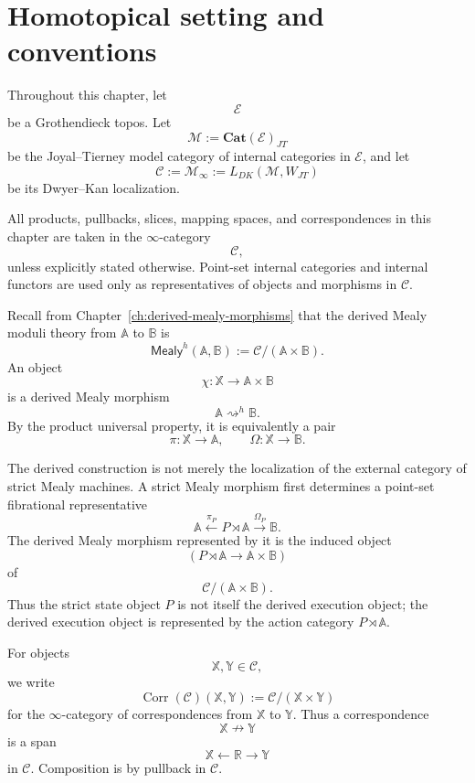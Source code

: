 \section{Homotopical setting and conventions}
\label{sec:derived-relative-homotopical-setting}

Throughout this chapter, let
\[
\mathcal E
\]
be a Grothendieck topos. Let
\[
\mathcal M:=\mathbf{Cat}(\mathcal E)_{JT}
\]
be the Joyal--Tierney model category of internal categories in \(\mathcal E\),
and let
\[
\mathcal C
:=
\mathcal M_\infty
:=
L_{DK}(\mathcal M,W_{JT})
\]
be its Dwyer--Kan localization.

All products, pullbacks, slices, mapping spaces, and correspondences in this
chapter are taken in the \(\infty\)-category
\[
\mathcal C,
\]
unless explicitly stated otherwise. Point-set internal categories and internal
functors are used only as representatives of objects and morphisms in
\(\mathcal C\).

Recall from Chapter~\ref{ch:derived-mealy-morphisms} that the derived Mealy
moduli theory from \(\mathbb A\) to \(\mathbb B\) is
\[
\mathsf{Mealy}^h(\mathbb A,\mathbb B)
:=
\mathcal C/(\mathbb A\times\mathbb B).
\]
An object
\[
\chi:\mathbb X\to\mathbb A\times\mathbb B
\]
is a derived Mealy morphism
\[
\mathbb A\rightsquigarrow^h\mathbb B.
\]
By the product universal property, it is equivalently a pair
\[
\pi:\mathbb X\to\mathbb A,
\qquad
\Omega:\mathbb X\to\mathbb B.
\]

\begin{remark}
\label{rem:derived-relative-not-localization-only}
The derived construction is not merely the localization of the external
category of strict Mealy machines. A strict Mealy morphism first determines a
point-set fibrational representative
\[
\mathbb A
\xleftarrow{\pi_P}
P\rtimes\mathbb A
\xrightarrow{\Omega_P}
\mathbb B.
\]
The derived Mealy morphism represented by it is the induced object
\[
(P\rtimes\mathbb A\to\mathbb A\times\mathbb B)
\]
of
\[
\mathcal C/(\mathbb A\times\mathbb B).
\]
Thus the strict state object \(P\) is not itself the derived execution object;
the derived execution object is represented by the action category
\(P\rtimes\mathbb A\).
\end{remark}

\begin{definition}
\label{def:derived-relative-corr-notation}
For objects
\[
\mathbb X,\mathbb Y\in\mathcal C,
\]
we write
\[
\operatorname{Corr}(\mathcal C)(\mathbb X,\mathbb Y)
:=
\mathcal C/(\mathbb X\times\mathbb Y)
\]
for the \(\infty\)-category of correspondences from \(\mathbb X\) to
\(\mathbb Y\). Thus a correspondence
\[
\mathbb X\nrightarrow\mathbb Y
\]
is a span
\[
\mathbb X
\longleftarrow
\mathbb R
\longrightarrow
\mathbb Y
\]
in \(\mathcal C\). Composition is by pullback in \(\mathcal C\).
\end{definition}

